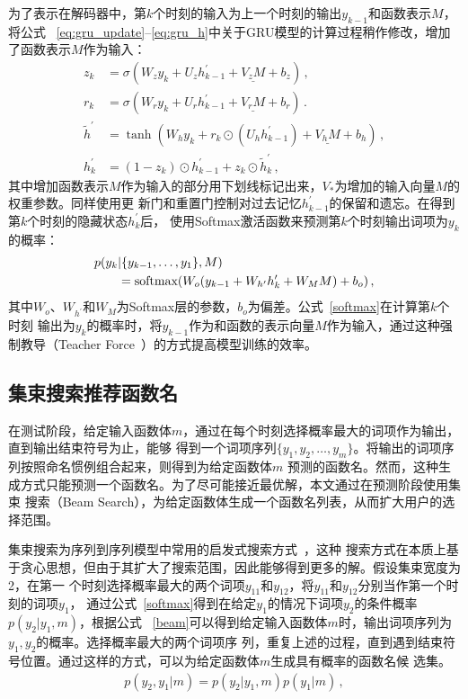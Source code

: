 为了表示在解码器中，第$k$个时刻的输入为上一个时刻的输出$y_{k-1}$和函数表示$M$，将公式
~\eqref{eq:gru_update}--\eqref{eq:gru_h}中关于GRU模型的计算过程稍作修改，增加了函数表示$M$作为输入：
\begin{align}
z_k &= \sigma(W_z y_k + U_z h^\prime_{k-1} + \underline{V_z M} + b_z) \,, \\
r_k &= \sigma(W_r y_k + U_r h^\prime_{k-1} + \underline{V_r M} + b_r) \,.\\
\tilde{h}^\prime &= \tanh(W_h y_k + r_k \odot (U_h h^\prime_{k-1}) + 
\underline{V_h M} + 
b_h) \,, \\
h^\prime_k &= (1-z_k)\odot h^\prime_{k-1} + z_k \odot \tilde h^\prime_k \,, 
\end{align}
其中增加函数表示$M$作为输入的部分用下划线标记出来，$V_{*}$为增加的输入向量$M$的权重参数。同样使用更
新门和重置门控制对过去记忆$h^\prime_{k-1}$的保留和遗忘。在得到第$k$个时刻的隐藏状态$h^\prime_k$后，
使用Softmax激活函数来预测第$k$个时刻输出词项为$y_k$的概率：
\begin{align}
p(y_k&|\{y_{k-1}, \dots, y_1\}, M) \notag\\
&= \text{softmax}(W_o(y_{k-1} + W_{h^\prime}h^\prime_k + W_M M) + b_o) \,,
\end{align}
\label{softmax}
其中$W_o$、$W_{h^\prime}$和$W_M$为Softmax层的参数，$b_o$为偏差。公式~\ref{softmax}在计算第$k$个时刻
输出为$y_k$的概率时，将$y_{k-1}$作为和函数的表示向量$M$作为输入，通过这种强制教导（Teacher
Force~\cite{Williams1989learning}）的方式提高模型训练的效率。

\subsection{集束搜索推荐函数名}
在测试阶段，给定输入函数体$m$，通过在每个时刻选择概率最大的词项作为输出，直到输出结束符号为止，能够
得到一个词项序列$\{y_1,y_2,\dots,y_m\}$。将输出的词项序列按照命名惯例组合起来，则得到为给定函数体$m$
预测的函数名。然而，这种生成方式只能预测一个函数名。为了尽可能接近最优解，本文通过在预测阶段使用集束
搜索（Beam Search），为给定函数体生成一个函数名列表，从而扩大用户的选择范围。

集束搜索为序列到序列模型中常用的启发式搜索方式~\cite{Graves2012Sequence,sutskever2014sequence}，这种
搜索方式在本质上基于贪心思想，但由于其扩大了搜索范围，因此能够得到更多的解。假设集束宽度为2，在第一
个时刻选择概率最大的两个词项$y_{11}$和$y_{12}$，将$y_{11}$和$y_{12}$分别当作第一个时刻的词项$y_1$，
通过公式~\eqref{softmax}得到在给定$y_1$的情况下词项$y_2$的条件概率$p(y_2|y_1,m)$，根据公式
~\eqref{beam}可以得到给定输入函数体$m$时，输出词项序列为$y_1,y_2$的概率。选择概率最大的两个词项序
列，重复上述的过程，直到遇到结束符号位置。通过这样的方式，可以为给定函数体$m$生成具有概率的函数名候
选集。
\begin{align}
p(y_2,y_1|m) = p(y_2|y_1,m)p(y_1|m) \,,
\end{align}
\label{beam}

